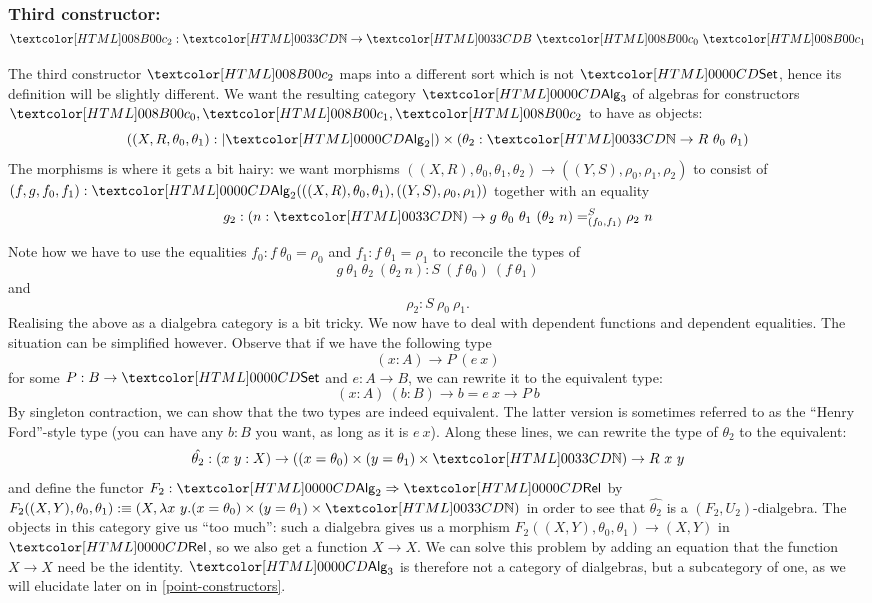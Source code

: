 \subsubsection{Third constructor: $\Bcii : \natty \to \Bty\ \Aco\ \Aci$}

The third constructor $\Bcii$ maps into a different sort which is not
$\Set$, hence its definition will be slightly different. We want the
resulting category $\Alg_3$ of algebras for constructors
$\Aco, \Aci, \Bcii$ to have as objects:
$$
((X,R,\theta_0,\theta_1) : | \Alg_2 |) \times (\theta_2 : \natty \to R\ \theta_0\ \theta_1)
$$
The morphisms is where it gets a bit hairy: we want morphisms
$((X,R),\theta_0,\theta_1,\theta_2) \to ((Y,S),\rho_0,\rho_1,\rho_2)$
to consist of
$(f,g,f_0,f_1) :
\Alg_2(((X,R),\theta_0,\theta_1),((Y,S),\rho_0,\rho_1))$
together with an equality
$$
g_2 : (n : \natty)  \to \pathover{S}{(f_0,f_1)}{g\ \theta_0\ \theta_1\ (\theta_2\ n)}{\rho_2\ n}
$$

Note how we have to use the equalities $f_0 : f\ \theta_0 = \rho_0$ and
$f_1 : f\ \theta_1 = \rho_1$ to reconcile the types of
$$
g\ \theta_1\ \theta_2\ (\theta_2\ n) : S\ (f\ \theta_0)\ (f\ \theta_1)
$$
and 
$$
\rho_2 : S\ \rho_0\ \rho_1 .
$$
Realising the above as a dialgebra category is a bit tricky. We now
have to deal with dependent functions and dependent equalities. The
situation can be simplified however. Observe that if we have the
following type
$$
(x : A) \to P\ (e\ x)
$$
for some $P : B \to \Set$ and $e : A \to B$, we can rewrite it to the
equivalent type:
$$
(x : A)\ (b : B) \to b = e\ x \to P\ b
$$
By singleton contraction, we can show that the two types are indeed
equivalent. The latter version is sometimes referred to as the ``Henry
Ford''-style type (you can have any $b : B$ you want, as long as it is
$e\ x$). Along these lines, we can rewrite the type of $\theta_2$ to the equivalent:
$$
\hat{\theta_2} : (x\ y : X) \to ((x = \theta_0) \times (y = \theta_1) \times \natty) \to R\ x\ y 
$$
and define the functor $F_2 : \Func{\Alg_2}{\Rel}$ by
$F_2 ((X,Y),\theta_0,\theta_1) \ddefeq (X , \lambda x\ y . (x =
\theta_0) \times (y = \theta_1) \times \natty)$
in order to see that $\hat{\theta_2}$ is a $(F_2,U_2)$-dialgebra. The
objects in this category give us ``too much'': such a dialgebra gives
us a morphism $F_2((X,Y),\theta_0,\theta_1) \to (X,Y)$ in $\Rel$, so
we also get a function $X \to X$. We can solve this problem by adding
an equation that the function $X \to X$ need be the identity. $\Alg_3$
is therefore not a category of dialgebras, but a subcategory of one,
as we will elucidate later on in \cref{point-constructors}.

